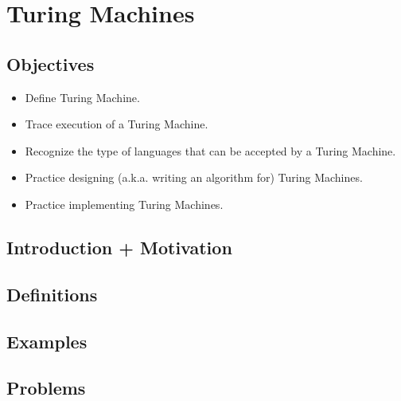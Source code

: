 \chapter{Turing Machines}

\section{Objectives}

\begin{itemize}
	\item Define Turing Machine.
	\item Trace execution of a Turing Machine.
	\item Recognize the type of languages that can be accepted by a Turing Machine.
	\item Practice designing (a.k.a. writing an algorithm for) Turing Machines.
	\item Practice implementing Turing Machines.
\end{itemize}

\section{Introduction + Motivation}

\section{Definitions}

\section{Examples}

\section{Problems}